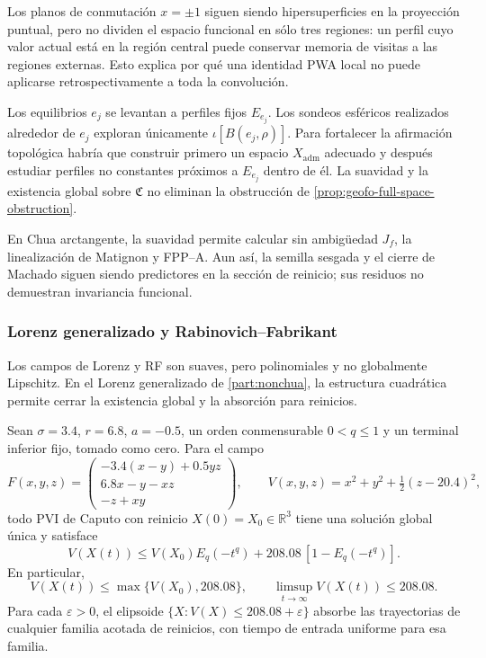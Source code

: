 Los planos de conmutación \(x=\pm1\) siguen siendo hipersuperficies en la
proyección puntual, pero no dividen el espacio funcional en sólo tres regiones:
un perfil cuyo valor actual está en la región central puede conservar memoria
de visitas a las regiones externas. Esto explica por qué una identidad PWA
local no puede aplicarse retrospectivamente a toda la convolución.

Los equilibrios \(e_j\) se levantan a perfiles fijos \(E_{e_j}\). Los sondeos
esféricos realizados alrededor de \(e_j\) exploran únicamente
\(\iota[B(e_j,\rho)]\). Para fortalecer la afirmación topológica habría que
construir primero un espacio \(X_{\mathrm{adm}}\) adecuado y después
estudiar perfiles no constantes próximos a \(E_{e_j}\) dentro de él.
La suavidad y la existencia global sobre \(\mathfrak C\) no eliminan
la obstrucción de \cref{prop:geofo-full-space-obstruction}.

En Chua arctangente, la suavidad permite calcular sin ambigüedad \(J_f\), la
linealización de Matignon y FPP--A. Aun así, la semilla sesgada y el cierre de
Machado siguen siendo predictores en la sección de reinicio; sus residuos no
demuestran invariancia funcional.

\subsubsection{Lorenz generalizado y Rabinovich--Fabrikant}

Los campos de Lorenz y RF son suaves, pero polinomiales y no globalmente
Lipschitz. En el Lorenz generalizado de \cref{part:nonchua}, la estructura
cuadrática permite cerrar la existencia global y la absorción para reinicios.

\begin{proposition}
\label{prop:geofo-lorenz-boundedness}
Sean \(\sigma=3.4\), \(r=6.8\), \(a=-0.5\), un orden conmensurable
\(0<q\leq1\) y un terminal inferior fijo, tomado como cero. Para el campo
\begin{equation}
 F(x,y,z)=\begin{pmatrix}
 -3.4(x-y)+0.5yz\\
 6.8x-y-xz\\
 -z+xy
 \end{pmatrix},
 \qquad
 V(x,y,z)=x^2+y^2+\tfrac12(z-20.4)^2,
 \label{eq:geofo-lorenz-lyapunov}
\end{equation}
todo PVI de Caputo con reinicio \(X(0)=X_0\in\mathbb R^3\) tiene una
solución global única y satisface
\begin{equation}
 V(X(t))\leq V(X_0)E_q(-t^q)
       +208.08\,[1-E_q(-t^q)].
 \label{eq:geofo-lorenz-comparison}
\end{equation}
En particular,
\begin{equation}
 V(X(t))\leq\max\{V(X_0),208.08\},
 \qquad \limsup_{t\to\infty}V(X(t))\leq208.08.
 \label{eq:geofo-lorenz-ultimate-bound}
\end{equation}
Para cada \(\varepsilon>0\), el elipsoide
\(\{X:V(X)\leq208.08+\varepsilon\}\) absorbe las trayectorias de
cualquier familia acotada de reinicios, con tiempo de entrada uniforme
para esa familia.
\end{proposition}

